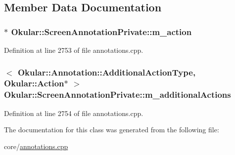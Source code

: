 \subsection{Member Data Documentation}
\hypertarget{classOkular_1_1ScreenAnnotationPrivate_aafed5fb8c9e503e70fc867f41c5e6978}{
\subsubsection[{m\+\_\+action}]{$\ast$ Okular\+::\+Screen\+Annotation\+Private\+::m\+\_\+action}}\label{classOkular_1_1ScreenAnnotationPrivate_aafed5fb8c9e503e70fc867f41c5e6978}


Definition at line 2753 of file annotations.\+cpp.

\hypertarget{classOkular_1_1ScreenAnnotationPrivate_a18cc906ba8755be93c5d5afea51758ad}{
\subsubsection[{m\+\_\+additional\+Actions}]{$<$ {\bf Okular\+::\+Annotation\+::\+Additional\+Action\+Type}, {\bf Okular\+::\+Action}$\ast$ $>$ Okular\+::\+Screen\+Annotation\+Private\+::m\+\_\+additional\+Actions}}\label{classOkular_1_1ScreenAnnotationPrivate_a18cc906ba8755be93c5d5afea51758ad}


Definition at line 2754 of file annotations.\+cpp.



The documentation for this class was generated from the following file\+:\begin{DoxyCompactItemize}
\item 
core/\hyperlink{annotations_8cpp}{annotations.\+cpp}\end{DoxyCompactItemize}
